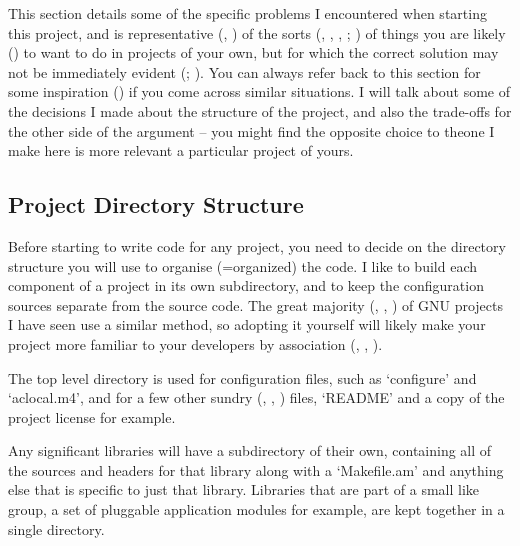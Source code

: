 This section details some of the specific problems I encountered when 
starting this project, and is representative ({\MaQ{}}, {\MdQ{}}) of 
the sorts ({\McQ{}}, {\MaQ{}}, {\McQ{}}, {\MbQ{}}; {\MbQ{}}) of things you are likely ({\MbQ{}})
to want to do in projects of your own, but for which the correct solution 
may not be immediately evident ({\MbQ{}}; {\MbQ{}}). You can always refer back to 
this section for some inspiration ({\MjQ{}}) if you come across similar situations.
I will talk about some of the decisions I made about the structure of the 
project, and also the trade-offs for the other side of the argument --
you might find the opposite choice to theone I make here is 
more relevant a particular project of yours. 

\subsection{Project Directory Structure}\label{pds}


Before starting to write code for any project, you need to decide on 
the directory structure you will use to organise (=organized) the code.
I like to build each component of a project in its own subdirectory,
and to keep the configuration sources separate from the source code.
The great majority ({\MaQ{}}, {\McQ{}}, {\MaQ{}}) of GNU projects I 
have seen use a similar method, so adopting it yourself will likely 
make your project more familiar to your developers 
by association ({\MaQ{}}, {\MaQ{}}, {\MbQ{}}). 


The top level directory is used for configuration files, such as `configure'
and `aclocal.m4', and for a few other sundry ({\MaQ{}}, {\MjQ{}}, {\MaQ{}})
files, `README' and a copy of the project license for example. 


Any significant libraries will have a subdirectory of their own, containing all of the sources and headers for that library along with a `Makefile.am' and anything else that is specific to just that library. Libraries that are part of a small like group, a set of pluggable application modules for example, are kept together in a single directory. 


